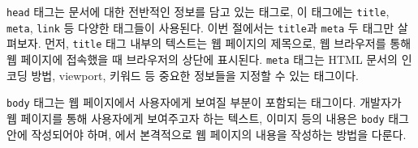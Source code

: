 \texttt{head} 태그는 문서에 대한 전반적인 정보를 담고 있는 태그로, 이 태그에는 \texttt{title}, \texttt{meta}, \texttt{link} 등 다양한 태그들이 사용된다. 이번 절에서는 \texttt{title}과 \texttt{meta} 두 태그만 살펴보자. 먼저, \texttt{title} 태그 내부의 텍스트는 웹 페이지의 제목으로, 웹 브라우저를 통해 웹 페이지에 접속했을 때 브라우저의 상단에 표시된다. \texttt{meta} 태그는 HTML 문서의 인코딩 방법, viewport, 키워드 등 중요한 정보들을 지정할 수 있는 태그이다.

\texttt{body} 태그는 웹 페이지에서 사용자에게 보여질 부분이 포함되는 태그이다. 개발자가 웹 페이지를 통해 사용자에게 보여주고자 하는 텍스트, 이미지 등의 내용은 \texttt{body} 태그 안에 작성되어야 하며, 에서 본격적으로 웹 페이지의 내용을 작성하는 방법을 다룬다.

